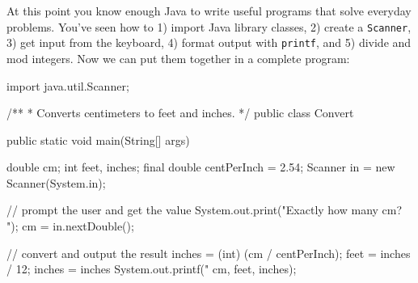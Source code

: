\documentclass[12pt]{book}
\theoremstyle{exercise}
\newcommand{\java}[1]{\verb"#1"}
\newcommand{\java}[1]{\lstinline{#1}} %
\begin{document}



At this point you know enough Java to write useful programs that solve everyday problems.
You've seen how to 1) import Java library classes, 2) create a \java{Scanner}, 3) get input from the keyboard, 4) format output with \java{printf}, and 5) divide and mod integers.
Now we can put them together in a complete program:


\begin{code}
import java.util.Scanner;

/**
 * Converts centimeters to feet and inches.
 */
public class Convert {
    public static void main(String[] args) {
        double cm;
        int feet, inches;
        final double centPerInch = 2.54;
        Scanner in = new Scanner(System.in);

        // prompt the user and get the value
        System.out.print("Exactly how many cm? ");
        cm = in.nextDouble();

        // convert and output the result
        inches = (int) (cm / centPerInch);
        feet = inches / 12;
        inches = inches %
        System.out.printf("%
                          cm, feet, inches);
    }
}
\end{code}
\end{document}

